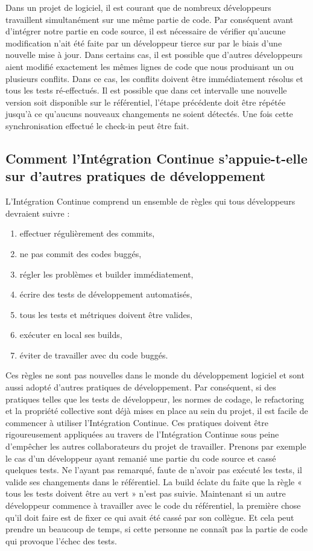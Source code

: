 \documentclass{report}
\begin{document}
      Dans un projet de logiciel, il est courant que de nombreux développeurs travaillent simultanément sur une même partie de code.  Par conséquent avant d’intégrer notre partie en code source, il est nécessaire de vérifier qu’aucune modification n’ait été faite par un développeur tierce sur par le biais d’une nouvelle mise à jour. Dans certains cas, il est possible que d’autres développeurs aient modifié exactement les mêmes lignes de code que nous produisant un ou plusieurs conflits. Dans ce cas, les conflits doivent être immédiatement résolus et tous les tests ré-effectués. Il est possible que dans cet intervalle une nouvelle version soit disponible sur le référentiel,  l'étape précédente doit être répétée jusqu'à ce qu'aucuns nouveaux changements ne soient détectés. Une fois cette synchronisation effectué le check-in peut être fait.

      \subsection{Comment l’Intégration Continue s’appuie-t-elle sur d’autres pratiques de développement}
      L’Intégration Continue comprend un ensemble de règles qui tous développeurs devraient suivre :

      \begin{enumerate}
        \item effectuer régulièrement des commits,
        \item ne pas commit des codes buggés,
        \item régler les problèmes et builder immédiatement,
        \item écrire des tests de développement automatisés,
        \item tous les tests et métriques doivent être valides,
        \item exécuter en local ses builds,
        \item éviter de travailler avec du code buggés.\\
      \end{enumerate}

      Ces règles ne sont pas nouvelles dans le monde du développement logiciel et sont aussi adopté d'autres pratiques de développement. Par conséquent, si des pratiques telles que les tests de développeur, les normes de codage, le refactoring et la propriété collective sont déjà mises en place au sein du projet, il est facile de commencer à utiliser l’Intégration Continue. Ces pratiques doivent être rigoureusement appliquées au travers de l’Intégration Continue sous peine d’empêcher les autres collaborateurs du projet de travailler. Prenons par exemple le cas d’un développeur ayant remanié une partie du code source et cassé quelques tests. Ne l’ayant pas remarqué, faute de n’avoir pas exécuté les tests, il valide ses changements dans le référentiel. La build éclate du faite que la règle « tous les tests doivent être au vert » n’est pas suivie. Maintenant si un autre développeur commence à travailler avec le code du référentiel, la première chose qu'il doit faire est de fixer ce qui avait été cassé par son collègue. Et cela peut prendre un beaucoup de temps, si cette personne ne connaît pas la partie de code qui provoque l’échec des tests.
\end{document}
